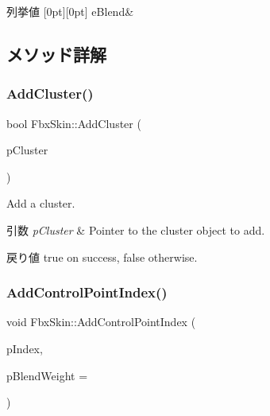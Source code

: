 \begin{DoxyEnumFields}{列挙値}
[0pt][0pt]{}\mbox{\label{class_fbx_skin_aee398789ebed22fa97269a26c6049a16af0f4a498471de5701994ed898252b864}} 
e\+Blend&\\
\hline

\end{DoxyEnumFields}


\subsection{メソッド詳解}
\mbox{\label{class_fbx_skin_a6eb5b55faf155b9c63f33c1ebf418508}} 
\subsubsection{\texorpdfstring{Add\+Cluster()}{AddCluster()}}
{\footnotesize\ttfamily bool Fbx\+Skin\+::\+Add\+Cluster (\begin{DoxyParamCaption}\item[{\hyperlink{class_fbx_cluster}{Fbx\+Cluster} $\ast$}]{p\+Cluster }\end{DoxyParamCaption})}

Add a cluster. 
\begin{DoxyParams}{引数}
{\em p\+Cluster} & Pointer to the cluster object to add. \\
\hline
\end{DoxyParams}
\begin{DoxyReturn}{戻り値}
{\ttfamily true} on success, {\ttfamily false} otherwise. 
\end{DoxyReturn}
\mbox{\label{class_fbx_skin_a23b0bc74cd2a08e2387d8619f59bb4f3}} 
\subsubsection{\texorpdfstring{Add\+Control\+Point\+Index()}{AddControlPointIndex()}}
{\footnotesize\ttfamily void Fbx\+Skin\+::\+Add\+Control\+Point\+Index (\begin{DoxyParamCaption}\item[{int}]{p\+Index,  }\item[{double}]{p\+Blend\+Weight = {} }\end{DoxyParamCaption})}

